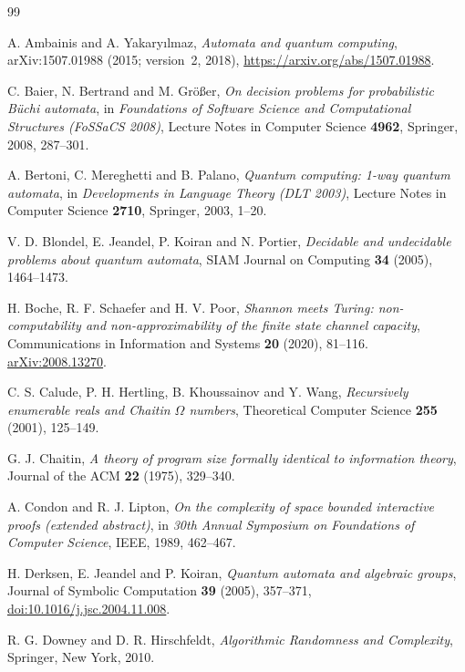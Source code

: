 \documentclass[11pt]{article}
\theoremstyle{plain}
\theoremstyle{definition}
\theoremstyle{remark}
\begin{document}
\begin{thebibliography}{99}\raggedright
{}
A. Ambainis and A. Yakary\i lmaz, \emph{Automata and quantum computing}, arXiv:1507.01988 (2015; version~2, 2018), \url{https://arxiv.org/abs/1507.01988}.

C. Baier, N. Bertrand and M. Gr\"o{\ss}er, \emph{On decision problems for probabilistic B\"uchi automata}, in \emph{Foundations of Software Science and Computational Structures (FoSSaCS 2008)}, Lecture Notes in Computer Science \textbf{4962}, Springer, 2008, 287--301.

A. Bertoni, C. Mereghetti and B. Palano, \emph{Quantum computing: 1-way quantum automata}, in \emph{Developments in Language Theory (DLT 2003)}, Lecture Notes in Computer Science \textbf{2710}, Springer, 2003, 1--20.

V. D. Blondel, E. Jeandel, P. Koiran and N. Portier, \emph{Decidable and undecidable problems about quantum automata}, SIAM Journal on Computing \textbf{34} (2005), 1464--1473.

H. Boche, R. F. Schaefer and H. V. Poor, \emph{Shannon meets Turing: non-computability and non-approximability of the finite state channel capacity}, Communications in Information and Systems \textbf{20} (2020), 81--116.
\href{https://arxiv.org/abs/2008.13270}{arXiv:2008.13270}.

C. S. Calude, P. H. Hertling, B. Khoussainov and Y. Wang, \emph{Recursively enumerable reals and Chaitin $\Omega$ numbers}, Theoretical Computer Science \textbf{255} (2001), 125--149.

G. J. Chaitin, \emph{A theory of program size formally identical to information theory}, Journal of the ACM \textbf{22} (1975), 329--340.

A. Condon and R. J. Lipton, \emph{On the complexity of space bounded interactive proofs (extended abstract)}, in \emph{30th Annual Symposium on Foundations of Computer Science}, IEEE, 1989, 462--467.

H. Derksen, E. Jeandel and P. Koiran, \emph{Quantum automata and algebraic groups}, Journal of Symbolic Computation \textbf{39} (2005), 357--371, \href{https://doi.org/10.1016/j.jsc.2004.11.008}{doi:10.1016/j.jsc.2004.11.008}.

R. G. Downey and D. R. Hirschfeldt, \emph{Algorithmic Randomness and Complexity}, Springer, New York, 2010.


\end{thebibliography}
\end{document}
